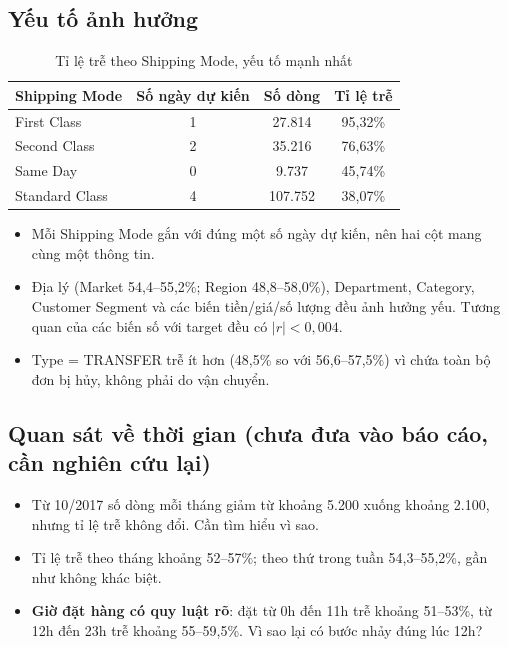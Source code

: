 \documentclass[11pt,a4paper]{article}
\newcommand{\col}[1]{\textsf{#1}}
\begin{document}
\subsection{Yếu tố ảnh hưởng}
\begin{table}[H]\centering
\caption{Tỉ lệ trễ theo Shipping Mode, yếu tố mạnh nhất}
\begin{tabular}{@{}lccc@{}}
\toprule
\textbf{Shipping Mode} & \textbf{Số ngày dự kiến} & \textbf{Số dòng} & \textbf{Tỉ lệ trễ} \\ \midrule
First Class & 1 & 27.814 & 95,32\% \\
Second Class & 2 & 35.216 & 76,63\% \\
Same Day & 0 & 9.737 & 45,74\% \\
Standard Class & 4 & 107.752 & 38,07\% \\
\bottomrule
\end{tabular}
\end{table}
\begin{itemize}
  \item Mỗi Shipping Mode gắn với đúng một số ngày dự kiến, nên hai cột mang cùng một thông tin.
  \item Địa lý (Market 54,4--55,2\%; Region 48,8--58,0\%), Department, Category, Customer Segment và các biến tiền/giá/số lượng đều ảnh hưởng yếu. Tương quan của các biến số với target đều có $|r| < 0{,}004$.
  \item \col{Type = TRANSFER} trễ ít hơn (48,5\% so với 56,6--57,5\%) vì chứa toàn bộ đơn bị hủy, không phải do vận chuyển.
\end{itemize}

\subsection{Quan sát về thời gian (chưa đưa vào báo cáo, cần nghiên cứu lại)}
\begin{itemize}
  \item Từ 10/2017 số dòng mỗi tháng giảm từ khoảng 5.200 xuống khoảng 2.100, nhưng tỉ lệ trễ không đổi. Cần tìm hiểu vì sao.
  \item Tỉ lệ trễ theo tháng khoảng 52--57\%; theo thứ trong tuần 54,3--55,2\%, gần như không khác biệt.
  \item \textbf{Giờ đặt hàng có quy luật rõ}: đặt từ 0h đến 11h trễ khoảng 51--53\%, từ 12h đến 23h trễ khoảng 55--59,5\%. Vì sao lại có bước nhảy đúng lúc 12h?
\end{itemize}

\end{document}
